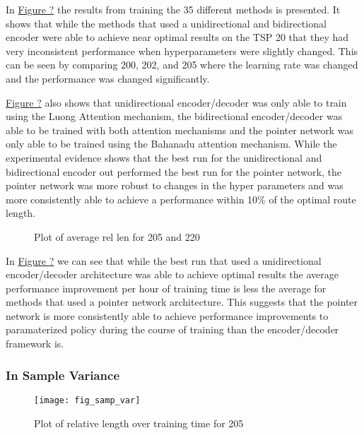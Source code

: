 \documentclass[12pt]{article}
\begin{document}
In \hyperref[fig_sl_table]{Figure ?} the results from training the 35 different methods is presented. It shows that while the methods that used a unidirectional and bidirectional encoder were able to achieve near optimal results on the TSP 20 that they had very inconsistent performance when hyperparameters were slightly changed. This can be seen by comparing 200, 202, and 205 where the learning rate was changed and the performance was changed significantly.

\hyperref[fig_sl_table]{Figure ?} also shows that unidirectional encoder/decoder was only able to train using the Luong Attention mechanism, the bidirectional encoder/decoder was able to be trained with both attention mechanisms and the pointer network was only able to be trained using the Bahanadu attention mechanism. While the experimental evidence shows that the best run for the unidirectional and bidirectional encoder out performed the best run for the pointer network, the pointer network was more robust to changes in the hyper parameters and was more consistently able to achieve a performance within 10\% of the optimal route length.

\begin{figure}[H]
  \centering
  \caption{Plot of average rel len for 205 and 220}
  \label{fig_sr_trainrate}
\end{figure}

In \hyperref[fig_sr_trainrate]{Figure ?} we can see that while the best run that used a unidirectional encoder/decoder architecture was able to achieve optimal results the average performance improvement per hour of training time is less the average for methods that used a pointer network architecture. This suggests that the pointer network is more consistently able to achieve performance improvements to paramaterized policy during the course of training than the encoder/decoder framework is.

\subsubsection{In Sample Variance}
\begin{figure}[H]
  \centering
  \texttt{[image: fig\_samp\_var]}
  \caption{Plot of relative length over training time for 205}
  \label{fig_samp_var}
\end{figure}
\end{document}
